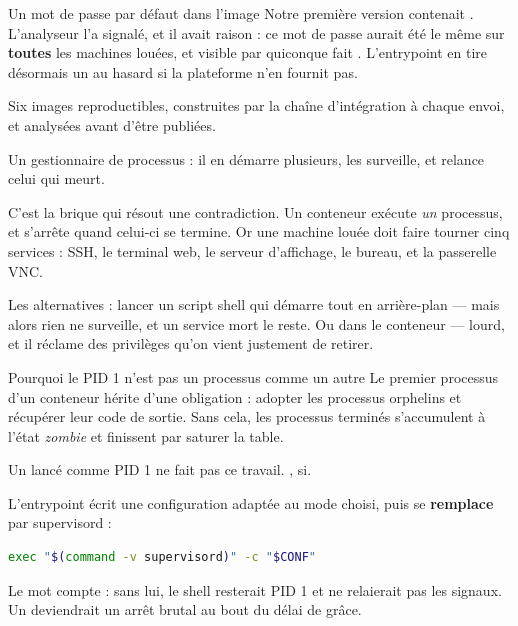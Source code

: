 \begin{piege}{Un mot de passe par défaut dans l'image}
Notre première version contenait . L'analyseur
 l'a signalé, et il avait raison : ce mot de passe aurait été le
même sur \textbf{toutes} les machines louées, et visible par quiconque fait
. L'entrypoint en tire désormais un au hasard si la
plateforme n'en fournit pas.
\end{piege}

\apport
Six images reproductibles, construites par la chaîne d'intégration à chaque
envoi, et analysées avant d'être publiées.


\quoi
Un gestionnaire de processus : il en démarre plusieurs, les surveille, et
relance celui qui meurt.

\pourquoi
C'est la brique qui résout une contradiction. Un conteneur exécute \emph{un}
processus, et s'arrête quand celui-ci se termine. Or une machine louée doit faire
tourner cinq services : SSH, le terminal web, le serveur d'affichage, le bureau,
et la passerelle VNC.

Les alternatives : lancer un script shell qui démarre tout en arrière-plan ---
mais alors rien ne surveille, et un service mort le reste. Ou  dans
le conteneur --- lourd, et il réclame des privilèges qu'on vient justement de
retirer.

\begin{notion}{Pourquoi le PID 1 n'est pas un processus comme un autre}
Le premier processus d'un conteneur hérite d'une obligation : adopter les
processus orphelins et récupérer leur code de sortie. Sans cela, les processus
terminés s'accumulent à l'état \emph{zombie} et finissent par saturer la table.

Un  lancé comme PID 1 ne fait pas ce travail. , si.
\end{notion}

\role
L'entrypoint écrit une configuration adaptée au mode choisi, puis se
\textbf{remplace} par supervisord :

\begin{lstlisting}[language=bash]
exec "$(command -v supervisord)" -c "$CONF"
\end{lstlisting}

Le mot  compte : sans lui, le shell resterait PID 1 et ne relaierait
pas les signaux. Un  deviendrait un arrêt brutal au bout du
délai de grâce.

